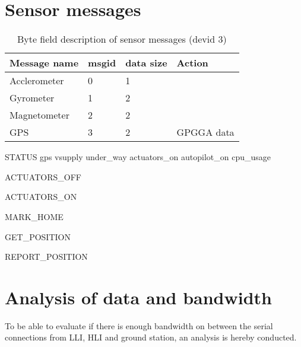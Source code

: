 \section{Sensor messages}
\begin{table}[h]
	\centering
	\begin{tabular}{llll}
		\toprule
		\textbf{Message name}  & \textbf{msgid} & \textbf{data size} & \textbf{Action}\\
		\midrule
		Acclerometer & 0 & 1 & \\
		Gyrometer & 1 & 2 & \\
		Magnetometer & 2 & 2 &  \\
		GPS & 3 & 2 & GPGGA data \\
		\bottomrule
	\end{tabular}
	\caption{Byte field description of sensor messages (devid 3)}
	\label{tab:ack}
\end{table}




STATUS
gps
vsupply
under\_way
actuators\_on
autopilot\_on
cpu\_usage

ACTUATORS\_OFF

ACTUATORS\_ON

MARK\_HOME

GET\_POSITION

REPORT\_POSITION


\section{Analysis of data and bandwidth}
\label{sec:lli-bandwith}
To be able to evaluate if there is enough bandwidth on between the serial connections from LLI, HLI and ground station, an analysis is hereby conducted.


